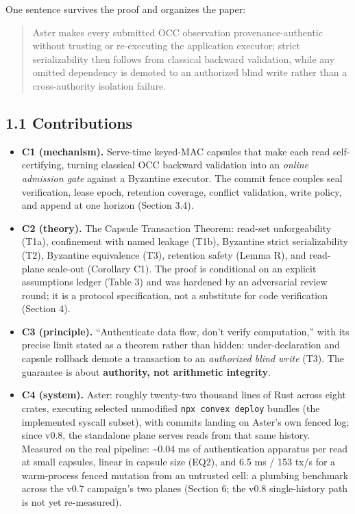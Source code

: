 \documentclass[
  11pt,
]{article}
\providecommand{\tightlist}{%
  \setlength{\itemsep}{0pt}\setlength{\parskip}{0pt}}
\begin{document}
One sentence survives the proof and organizes the paper:

\begin{quote}
Aster makes every submitted OCC observation provenance-authentic without trusting or re-executing the application executor; strict serializability then follows from classical backward validation, while any omitted dependency is demoted to an authorized blind write rather than a cross-authority isolation failure.
\end{quote}

\subsection{1.1 Contributions}\label{contributions}

\begin{itemize}
\tightlist
\item
  \textbf{C1 (mechanism).} Serve-time keyed-MAC capsules that make each read self-certifying, turning classical OCC backward validation into an \emph{online admission gate} against a Byzantine executor. The commit fence couples seal verification, lease epoch, retention coverage, conflict validation, write policy, and append at one horizon (Section 3.4).
\item
  \textbf{C2 (theory).} The Capsule Transaction Theorem: read-set unforgeability (T1a), confinement with named leakage (T1b), Byzantine strict serializability (T2), Byzantine equivalence (T3), retention safety (Lemma R), and read-plane scale-out (Corollary C1). The proof is conditional on an explicit assumptions ledger (Table 3) and was hardened by an adversarial review round; it is a protocol specification, not a substitute for code verification (Section 4).
\item
  \textbf{C3 (principle).} ``Authenticate data flow, don't verify computation,'' with its precise limit stated as a theorem rather than hidden: under-declaration and capsule rollback demote a transaction to an \emph{authorized blind write} (T3). The guarantee is about \textbf{authority, not arithmetic integrity}.
\item
  \textbf{C4 (system).} Aster: roughly twenty-two thousand lines of Rust across eight crates, executing selected unmodified \texttt{npx\ convex\ deploy} bundles (the implemented syscall subset), with commits landing on Aster's own fenced log; since v0.8, the standalone plane serves reads from that same history. Measured on the real pipeline: \textasciitilde0.04 ms of authentication apparatus per read at small capsules, linear in capsule size (EQ2), and 6.5 ms / 153 tx/s for a warm-process fenced mutation from an untrusted cell: a plumbing benchmark across the v0.7 campaign's two planes (Section 6; the v0.8 single-history path is not yet re-measured).
\end{itemize}
\end{document}
